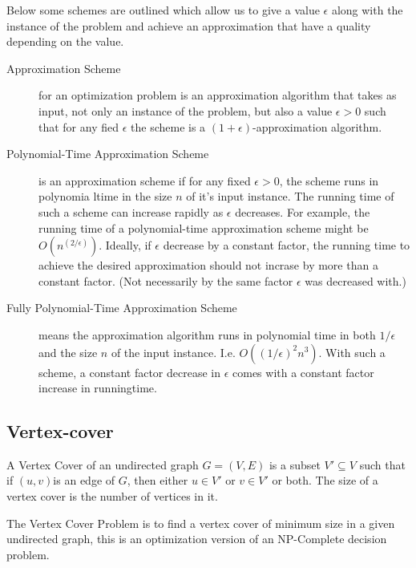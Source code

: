 Below some schemes are outlined which allow us to give a value $\epsilon$ along
with the instance of the problem and achieve an approximation that have a
quality depending on the value.
\begin{description}
\item[Approximation Scheme] for an optimization problem is an approximation
  algorithm that takes as input, not only an instance of the problem, but also a
  value $\epsilon > 0$ such that for any fied $\epsilon$ the scheme is a
  $(1+\epsilon)$-approximation algorithm.

\item[Polynomial-Time Approximation Scheme] is an approximation scheme if for
  any fixed $\epsilon > 0$, the scheme runs in polynomia ltime in the size $n$
  of it's input instance. The running time of such a scheme can increase rapidly
  as $\epsilon$ decreases. For example, the running time of a polynomial-time
  approximation scheme might be $O(n^{(2/\epsilon)})$. Ideally, if $\epsilon$
  decrease by a constant factor, the running time to achieve the desired
  approximation should not incrase by more than a constant factor. (Not
  necessarily by the same factor $\epsilon$ was decreased with.)

\item[Fully Polynomial-Time Approximation Scheme] means the approximation
  algorithm runs in polynomial time in both $1/\epsilon$ and the size $n$ of the
  input instance. I.e. $O((1/\epsilon)^2n^3)$. With such a scheme, a constant
  factor decrease in $\epsilon$ comes with a constant factor increase in
  runningtime.
\end{description}

\subsection{Vertex-cover}
A Vertex Cover of an undirected graph $G = (V,E)$ is a subset $V' \subseteq V$
such that if $(u,v)$is an edge of $G$, then either $u \in V'$ or $v \in V'$ or
both. The size of a vertex cover is the number of vertices in it.

The Vertex Cover Problem is to find a vertex cover of minimum size in a given
undirected graph, this is an optimization version of an NP-Complete decision
problem.

